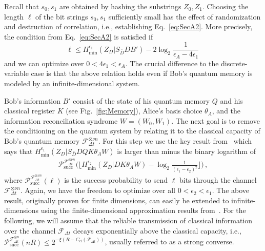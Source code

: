 \documentclass[aps,amsfonts,twoside,amssymb,superscriptaddress,twocolumn]{revtex4-1}
\newcommand*{\cF}{\mathcal{F}}
\newcommand*{\cP}{\mathcal{P}}
\newcommand*{\cl}{\textrm{cl}}
\newcommand*{\suc}{\textrm{succ}}
\begin{document}
Recall that $s_0,s_1$ are obtained by hashing the substrings $Z_0,Z_1$. Choosing the length $\ell$ of the bit strings $s_0,s_1$ sufficiently small has the effect of randomization and destruction of correlation, i.e., establishing Eq.~\eqref{eq:SecA2}. More precisely, the condition from Eq.~\eqref{eq:SecA2} is satisfied if~\cite{berta2011}
\begin{equation}\label{eq:hashLength1}
\ell \leq H^{\epsilon_1}_{\min}(Z_D|S_{\bar D} D B') - 2 \log_2\frac{1}{\epsilon_A-4\epsilon_1} \, 
\end{equation}  
and we can optimize over $0<4\epsilon_1 < \epsilon_A$. The crucial difference to the discrete-variable case is that the above relation holds even if Bob's quantum memory is modeled by an infinite-dimensional system. 

Bob's information $B'$ consist of the state of his quantum memory $Q$ and his classical register $K$ (see Fig.~\ref{fig:Memory}), Alice's basis choice $\theta_A$, and the information reconciliation syndrome $W=(W_0,W_1)$. The next goal is to remove the conditioning on the quantum system by relating it to the classical capacity of Bob's quantum memory $\cF_{\Delta t}^{\otimes \nu n}$. For this step we use the key result from~\cite{Koenig2012} which says that $ H^{\epsilon_1}_{\min}(Z_D|S_{\bar D} D Q K \theta_A W ) $ is larger than minus the binary logarithm of 
\begin{align} \label{eq:Psuc}
    \cP^{\cF_{\Delta t}^{\otimes \nu n}}_{\suc}\big(\lfloor H^{\epsilon_2}_{\min}(Z_D| D  K \theta_A W)  - \log_2\frac 1{(\epsilon_1-\epsilon_2)^2} \rfloor\big) \, , 
\end{align}
where  $\cP^{\cF_{\Delta t}^{\otimes \nu n}}_{\suc}(\ell)$ is the success probability to send $\ell$ bits through the channel $\cF_{\Delta t}^{\otimes \nu n}$. Again, we have the freedom to optimize over all $0< \epsilon_2<\epsilon_1$. The above result, originally proven for finite dimensions, can easily be extended to infinite-dimensions using the finite-dimensional approximation results from~\cite{Furrer10}. For the following, we will assume that the reliable transmission of classical information over the channel $\cF_{\Delta t}$ decays exponentially above the classical capacity, i.e., $\cP^{\cF_{\Delta t}^{\otimes n}}_{\suc}(nR)\leq 2^{-\xi(R- C_\cl(\cF_{\Delta t}))}$, usually referred to as a strong converse. 
\end{document}

